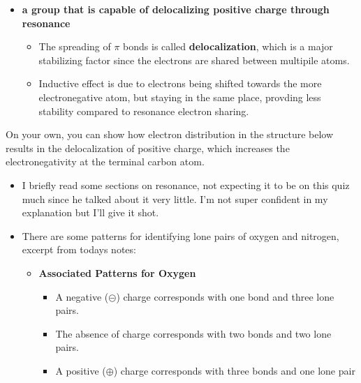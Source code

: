 \documentclass[12pt,a4paper]{article}
\begin{document}
\begin{enumerate}
        \begin{itemize}
            \item {\color{o-Sun}\textbf{a group that is capable of delocalizing positive charge through resonance}}
                \begin{itemize}
                    \item The spreading of $\pi$ bonds is called \textbf{delocalization}, {\color{o-Sun}which is a major stabilizing factor} since the electrons are shared between multipile atoms.
                    \item Inductive effect is due to electrons being shifted towards the more electronegative atom, but staying in the same place, provding less stability compared to resonance electron sharing.
                \end{itemize}
        \end{itemize}
    \newpage
    {\color{G-Moon}\item On your own, you can show how electron distribution in the structure below results in the delocalization of positive charge, which increases the electronegativity at the terminal carbon atom.
    \begin{center}
    \end{center}}
    \begin{itemize}
        \item I briefly read some sections on resonance, not expecting it to be on this quiz much since he talked about it very little. I'm not super confident in my explanation but I'll give it shot.
        \item There are some patterns for identifying lone pairs of oxygen and nitrogen, excerpt from todays notes:
            \begin{itemize}
                \item \textbf{Associated Patterns for Oxygen}
                \begin{itemize}
                    \item A {\color{neg}negative ($\circleddash$)} charge corresponds with {\color{o-Sun}one bond} and {\color{o-Sun}three lone pairs}.
                    \item The {\color{G-Moon}absence} of charge corresponds with {\color{o-Sun}two bonds} and {\color{o-Sun}two lone pairs}.
                    \item A {\color{pos}positive ($\oplus$)} charge corresponds with {\color{o-Sun}three bonds} and {\color{o-Sun}one lone pair} 

\end{itemize}
\end{itemize}
\end{itemize}
\end{enumerate}
\end{document}
